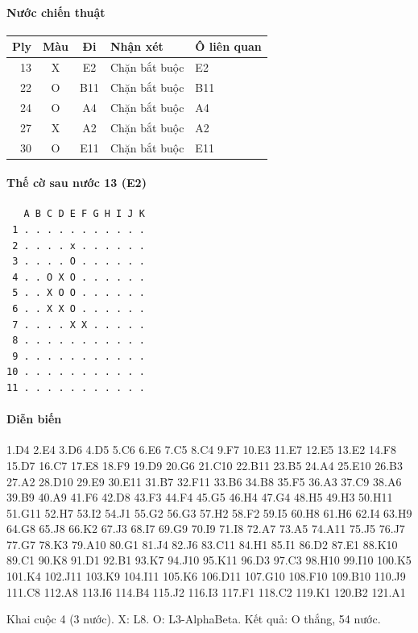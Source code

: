 \paragraph{Nước chiến thuật}
\begin{center}\small
\begin{tabular}{@{}rccll@{}}
\toprule
Ply & Màu & Đi & Nhận xét & Ô liên quan \\
\midrule
13 & X & E2 & Chặn bắt buộc & E2 \\
22 & O & B11 & Chặn bắt buộc & B11 \\
24 & O & A4 & Chặn bắt buộc & A4 \\
27 & X & A2 & Chặn bắt buộc & A2 \\
30 & O & E11 & Chặn bắt buộc & E11 \\
\bottomrule
\end{tabular}
\end{center}
\paragraph{Thế cờ sau nước 13 (E2)}
\begin{verbatim}
   A B C D E F G H I J K
 1 . . . . . . . . . . .
 2 . . . . x . . . . . .
 3 . . . . O . . . . . .
 4 . . O X O . . . . . .
 5 . . X O O . . . . . .
 6 . . X X O . . . . . .
 7 . . . . X X . . . . .
 8 . . . . . . . . . . .
 9 . . . . . . . . . . .
10 . . . . . . . . . . .
11 . . . . . . . . . . .
\end{verbatim}
\paragraph{Diễn biến}
{\footnotesize 1.D4 2.E4 3.D6 4.D5 5.C6 6.E6 7.C5 8.C4 9.F7 10.E3 11.E7 12.E5 13.E2 14.F8 15.D7 16.C7 17.E8 18.F9 19.D9 20.G6 21.C10 22.B11 23.B5 24.A4 25.E10 26.B3 27.A2 28.D10 29.E9 30.E11 31.B7 32.F11 33.B6 34.B8 35.F5 36.A3 37.C9 38.A6 39.B9 40.A9 41.F6 42.D8 43.F3 44.F4 45.G5 46.H4 47.G4 48.H5 49.H3 50.H11 51.G11 52.H7 53.I2 54.J1 55.G2 56.G3 57.H2 58.F2 59.I5 60.H8 61.H6 62.I4 63.H9 64.G8 65.J8 66.K2 67.J3 68.I7 69.G9 70.I9 71.I8 72.A7 73.A5 74.A11 75.J5 76.J7 77.G7 78.K3 79.A10 80.G1 81.J4 82.J6 83.C11 84.H1 85.I1 86.D2 87.E1 88.K10 89.C1 90.K8 91.D1 92.B1 93.K7 94.J10 95.K11 96.D3 97.C3 98.H10 99.I10 100.K5 101.K4 102.J11 103.K9 104.I11 105.K6 106.D11 107.G10 108.F10 109.B10 110.J9 111.C8 112.A8 113.I6 114.B4 115.J2 116.I3 117.F1 118.C2 119.K1 120.B2 121.A1\par}
Khai cuộc 4 (3 nước). X: L8. O: L3-AlphaBeta. Kết quả: O thắng, 54 nước.
